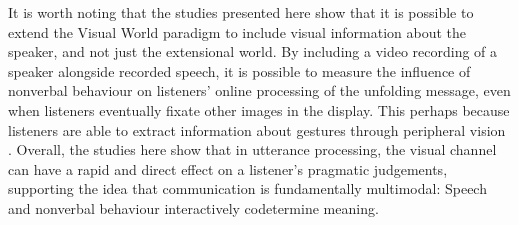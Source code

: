 \documentclass[a4paper,man,natbib]{apa6}
\begin{document}
It is worth noting that the studies presented here show that it is possible to extend the Visual World paradigm to include visual information about the speaker, and not just the extensional world. %
By including a video recording of a speaker alongside recorded speech, it is possible to measure the influence of nonverbal behaviour on listeners' online processing of the unfolding message, even when listeners eventually fixate other images in the display.
This perhaps because listeners are able to extract information about gestures through peripheral vision \citep[see e.g.][]{Gullberg2006}. %
Overall, the studies here show that in utterance processing, the visual channel can have a rapid and direct effect on a listener's pragmatic judgements, supporting the idea that communication is fundamentally multimodal: 
Speech and nonverbal behaviour interactively codetermine meaning.


\end{document}
